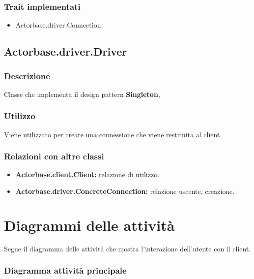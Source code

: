 \documentclass[a4paper]{article}
\begin{document}
			\subsubsection{Trait implementati}
				\begin{itemize}
					\item Actorbase.driver.Connection
				\end{itemize}
				
		\subsection{Actorbase.driver.Driver}
			\subsubsection{Descrizione}
				Classe che implementa il design pattern \textbf{Singleton}, 
				
			\subsubsection{Utilizzo}
				Viene utilizzato per creare una connessione che viene restituita al client. 
				
			\subsubsection{Relazioni con altre classi}
				\begin{itemize}
					\item \textbf{Actorbase.client.Client:} relazione di utilizzo.
					\item \textbf{Actorbase.driver.ConcreteConnection:} relazione uscente, creazione.
				\end{itemize}
		
		
	\newpage 
	\section{Diagrammi delle attività}
		Segue il diagramma delle attività che mostra l'interazione dell'utente con il client.
		\subsubsection{Diagramma attività principale}
		
\end{document}
